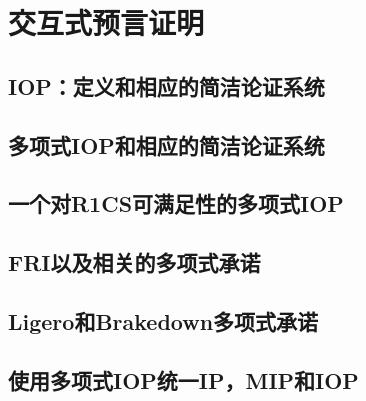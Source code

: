 \chapter{交互式预言证明}\label{chp:10IOP}

\section{IOP：定义和相应的简洁论证系统}\label{10.1}
\section{多项式IOP和相应的简洁论证系统}\label{10.2}
\section{一个对R1CS可满足性的多项式IOP}\label{10.3}
\section{FRI以及相关的多项式承诺}\label{10.4}
\section{Ligero和Brakedown多项式承诺}\label{10.5}
\section{使用多项式IOP统一IP，MIP和IOP}\label{10.6}
